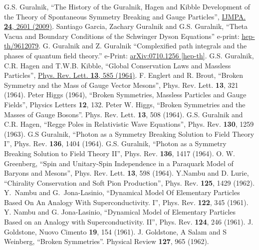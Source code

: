 \documentclass[12pt]{article}
\begin{document}
\begin{thebibliography}{99}
 G.S. Guralnik, ``The History of the Guralnik, Hagen and
  Kibble Development of the Theory of Spontaneous Symmetry Breaking and Gauge
  Particles'', \href{http://dx.doi.org/10.1142/S0217751X09045431}{IJMPA. {\bf 24}, 2601 (2009)}.
 Santiago Garcia, Zachary Guralnik and G.S. Guralnik, ``Theta
  Vacua and Boundary Conditions of the Schwinger Dyson Equations'' e-print:
  \href{http://arxiv.org/abs/hep-th/9612079}{hep-th/9612079}.
 G. Guralnik and Z. Guralnik ``Complexified path integrals
  and the phases of quantum field theory.'' e-Print: \href{http://arxiv.org/abs/0710.1256}{arXiv:0710.1256 [hep-th]}.
 G.S. Guralnik, C.R. Hagen and T.W.B. Kibble, ``Global
  Conservation Laws and Massless Particles'',  \href{http://link.aps.org/doi/10.1103/PhysRevLett.13.585}{Phys. Rev. Lett. {\bf 13}, 585 (1964)}.
 F. Englert and R. Brout, ``Broken Symmetry and the Mass of
  Gauge Vector Mesons'', Phys. Rev. Lett. {\bf 13}, 321 (1964).
 Peter Higgs (1964), ``Broken Symmetries, Massless Particles
  and Gauge Fields'', Physics Letters {\bf 12}, 132.
 Peter W. Higgs, ``Broken Symmetries and the Masses of Gauge
  Bosons''. Phys. Rev. Lett. {\bf 13}, 508 (1964).
  G.S. Guralnik and C.R. Hagen, ``Regge Poles in Relativistic
  Wave Equations'', Phys. Rev. {\bf 130}, 1259 (1963).
 G.S Guralnik, ``Photon as a Symmetry Breaking Solution to
  Field Theory I'', Phys. Rev. {\bf 136}, 1404 (1964).
 G.S. Guralnik, ``Photon as a Symmetry Breaking Solution to
  Field Theory II'', Phys. Rev. {\bf 136}, 1417 (1964).
 O. W. Greenberg, ``Spin and Unitary-Spin Independence in a
  Paraquark Model of Baryons and Mesons'', Phys. Rev. Lett. {\bf 13}, 598 (1964).
 Y.Nambu and D. Lurie, ``Chirality Conservation and Soft Pion
  Production'', Phys. Rev. {\bf 125}, 1429 (1962).
 Y.~Nambu and G.~Jona-Lasinio, ``Dynamical Model Of
    Elementary Particles Based On An Analogy With Superconductivity. I'',
    Phys. Rev. {\bf 122}, 345 (1961).
 Y. Nambu and G. Jona-Lasinio, ``Dynamical Model of
  Elementary Particles Based on an Analogy with Superconductivity. II'',
  Phys. Rev. {\bf 124}, 246 (1961).
 J. Goldstone, Nuovo Cimento {\bf 19}, 154 (1961).
 J. Goldstone, A Salam and S Weinberg, ``Broken
  Symmetries''. Physical Review {\bf 127}, 965 (1962).

\end{thebibliography}
\end{document}
